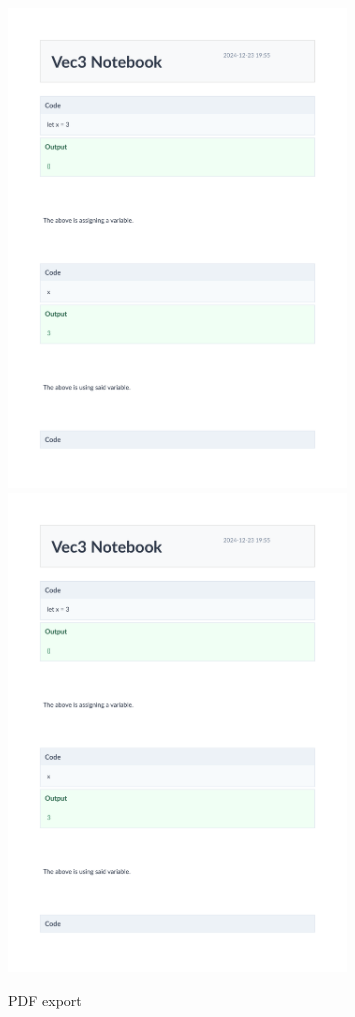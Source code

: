 \begin{figure}[H]
    \centering
    \includegraphics[page=1,width=0.8\textwidth]{assets/plotPDF}
    \includegraphics[page=2,width=0.8\textwidth]{assets/plotPDF}
    \caption{PDF export}\label{fig:pdf-export}
\end{figure}

